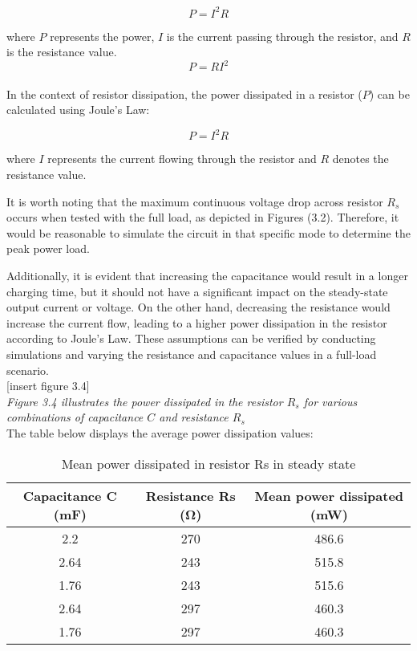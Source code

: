 \[ P = I^2R \]

where $P$ represents the power, $I$ is the current passing through the resistor, and $R$ is the resistance value.\\

\begin{equation}
    P=RI^2
\end{equation}\\

In the context of resistor dissipation, the power dissipated in a resistor ($P$) can be calculated using Joule's Law:

\[ P = I^2R \]

where $I$ represents the current flowing through the resistor and $R$ denotes the resistance value.

It is worth noting that the maximum continuous voltage drop across resistor $R_s$ occurs when tested with the full load, as depicted in Figures (3.2). Therefore, it would be reasonable to simulate the circuit in that specific mode to determine the peak power load.

Additionally, it is evident that increasing the capacitance would result in a longer charging time, but it should not have a significant impact on the steady-state output current or voltage. On the other hand, decreasing the resistance would increase the current flow, leading to a higher power dissipation in the resistor according to Joule's Law. These assumptions can be verified by conducting simulations and varying the resistance and capacitance values in a full-load scenario.\\

[insert figure 3.4]\\

\emph{Figure 3.4 illustrates the power dissipated in the resistor $R_s$ for various combinations of capacitance $C$ and resistance $R_s$}\\

The table below displays the average power dissipation values:\\

\begin{table}[h]
\centering
\caption{Mean power dissipated in resistor Rs in steady state}
\begin{tabular}{ccc}
\hline
Capacitance C (mF) & Resistance Rs (Ω) & Mean power dissipated (mW) \\
\hline
2.2                & 270               & 486.6                      \\
2.64               & 243               & 515.8                      \\
1.76               & 243               & 515.6                      \\
2.64               & 297               & 460.3                      \\
1.76               & 297               & 460.3                      \\
\hline
\end{tabular}
\end{table}\\

